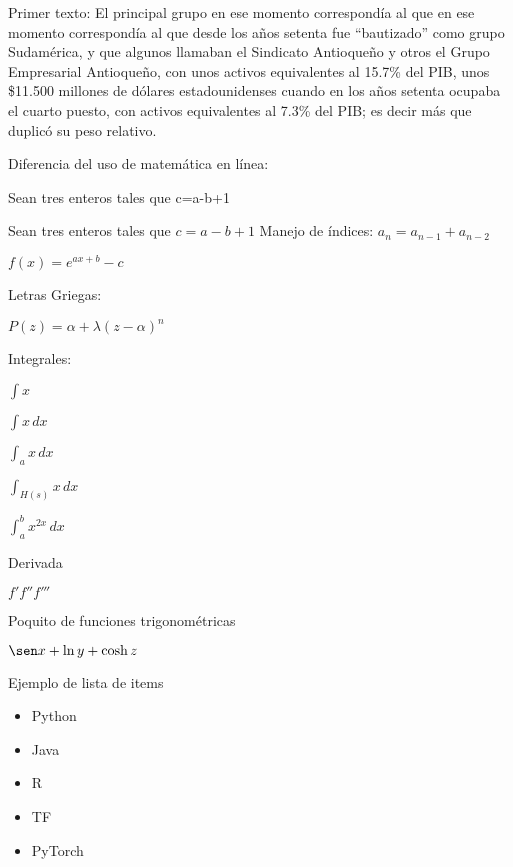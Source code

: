 \documentclass{article}
\begin{document}
    Primer texto:
    El principal grupo en ese momento correspondía al que en ese momento correspondía
    al que desde los años setenta fue ``bautizado'' como grupo Sudamérica, y que algunos
    llamaban el Sindicato Antioqueño y otros el Grupo Empresarial Antioqueño, con unos activos
    equivalentes al 15.7\% del PIB, unos \$11.500 millones de dólares estadounidenses cuando en
    los años setenta ocupaba el cuarto puesto, con activos equivalentes al 7.3\% del PIB; es decir
    más que duplicó su peso relativo.

    Diferencia del uso de matemática en línea:

    Sean tres enteros tales que c=a-b+1

    Sean tres enteros tales que $c=a-b+1$
    Manejo de índices:
    $a_n = a_{n - 1} + a_{n - 2}$

    $f(x) = e^{ax + b} - c$

    Letras Griegas:

    $P(z)=\alpha+\lambda(z - \alpha)^{n}$

    Integrales:

    $\int x$

    $\int x \,dx$

    $\int_a x \,dx$

    $\int_{H(s)} x \,dx$

    $\int_{a}^{b} x^{2x} \,dx $

    Derivada

    $f' f'' f'''$

    Poquito de funciones trigonométricas

    $\sen x + \ln y +  \cosh z$

    Ejemplo de lista de items
    \begin{itemize}
        \item Python
        \item Java
        \item R
        \item TF
        \item PyTorch
    \end{itemize}
\end{document}
